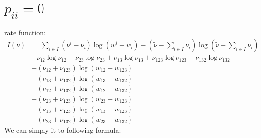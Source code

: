 \documentclass[a4paper,11pt]{article}
\begin{document}
\section{$p_{ii}=0$}
rate function:
\begin{align*}
    I(\nu)
    &= \sum_{i \in I} (\nu^{i}-\nu_{i}) \log (w^{i}-w_{i})
    - (\tilde{\nu} - \sum_{i \in I} \nu_{i}) \log (\tilde{\nu} - \sum_{i \in I} \nu_{i}) \\
    &+ \nu_{12} \log \nu_{12} + \nu_{23} \log \nu_{23} + \nu_{13} \log \nu_{13} +\nu_{123} \log \nu_{123} + \nu_{132} \log \nu_{132} \\
    &- (\nu_{12} + \nu_{123}) \log(w_{12} + w_{123}) \\
    &- (\nu_{13} + \nu_{132}) \log(w_{13} + w_{132}) \\
    &- (\nu_{12} + \nu_{132}) \log(w_{12} + w_{132}) \\
    &- (\nu_{23} + \nu_{123}) \log(w_{23} + w_{123}) \\
    &- (\nu_{13} + \nu_{123}) \log(w_{13} + w_{123}) \\
    &- (\nu_{23} + \nu_{132}) \log(w_{23} + w_{132}) 
\end{align*}
We can simply it to following formula:
\end{document}

